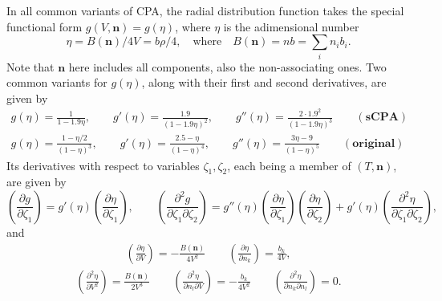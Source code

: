 \documentclass[10pt, a4paper]{article}
\newcommand{\mbf}[0]{\mathbf}
\newcommand*{\pder}[2]{\left(\frac{\partial #1}{\partial #2}\right)}
\newcommand*{\pdder}[2]{\left(\frac{\partial^2 #1}{\partial #2^2}\right)}
\newcommand*{\pdcross}[3]{\left(\frac{\partial^2 #1}{\partial #2 \partial #3}\right)}
\newcommand{\lp}{\left(}
\newcommand{\rp}{\right)}
\begin{document}
In all common variants of CPA, the radial distribution function takes the special functional form $g(V,\mbf n) = g(\eta)$, where $\eta$ is the adimensional number
$$
\eta = B(\mbf n)/4V = b\rho/4, \quad \text{where} \quad B(\mbf n) = nb = \sum_i n_i b_i.
$$
Note that $\mbf n$ here includes all components, also the non-associating ones. Two common variants for $g(\eta)$, along with their first and second derivatives, are given by
\begin{align*}
  g(\eta) = \frac{1}{1-1.9 \eta}, \qquad g'(\eta) = \frac{1.9}{(1-1.9\eta)^2}, \qquad g''(\eta) = \frac{2 \cdot 1.9^2}{(1-1.9\eta)^3} \qquad \mathbf{(sCPA)} \\
  g(\eta) = \frac{1-\eta/2}{(1- \eta)^3}, \qquad g'(\eta) = \frac{2.5-\eta}{(1-\eta)^4}, \qquad g''(\eta) = \frac{3\eta-9}{(1-\eta)^5} \qquad \mathbf{(original)}
\end{align*}
Its derivatives with respect to variables $\zeta_1,\zeta_2$, each being a member of $(T,\mbf n)$, are given by
\begin{equation}
  \pder{g}{\zeta_1} = g'(\eta) \pder{\eta}{\zeta_1}, \qquad \pdcross{g}{\zeta_1}{\zeta_2} = g''(\eta) \pder{\eta}{\zeta_1} \pder{\eta}{\zeta_2} + g'(\eta) \pdcross{\eta}{\zeta_1}{\zeta_2},
\end{equation}
and
\begin{align}
 \pder{\eta}{V} = -\frac{B(\mbf n)}{4V^2} \qquad  \pder{\eta}{n_k} = \frac{b_k}{4V},
\end{align}
\begin{align}
  \pdder{\eta}{V} = \frac{B(\mbf n)}{2V^3} \qquad \pdcross{\eta}{n_l}{V}  = -\frac{b_k}{4V^2} \qquad  \pdcross{\eta}{n_k}{n_l} = 0.
\end{align}
\end{document}
